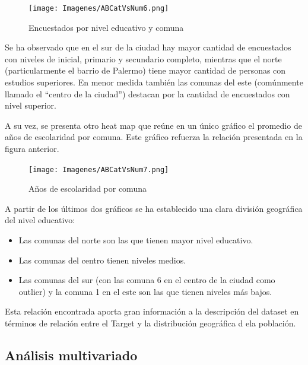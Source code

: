 \documentclass[a4paper]{article}
\begin{document}
            \begin{figure}[H]
            \centering
                \texttt{[image: Imagenes/ABCatVsNum6.png]}
                \caption{Encuestados por nivel educativo y comuna}
                \label{AB education level and location}
            \end{figure}
 
            Se ha observado que en el sur de la ciudad hay  mayor cantidad de encuestados con niveles de inicial, primario y secundario completo, mientras que el norte (particularmente el barrio de Palermo) tiene mayor cantidad de personas con estudios superiores. En menor medida también las comunas del este (comúnmente llamado el ``centro de la ciudad'') destacan por la cantidad de encuestados con nivel superior.

\vspace{1cm}

            A su vez, se presenta otro heat map que reúne en un único gráfico el promedio de años de escolaridad por comuna. Este gráfico refuerza la relación presentada en la figura anterior.

            \begin{figure}[H]
            \centering
                \texttt{[image: Imagenes/ABCatVsNum7.png]}
                \caption{Años de escolaridad por comuna}
                \label{AB years of education and location}
            \end{figure}
 
            A partir de los últimos dos gráficos se ha establecido una clara división geográfica del nivel educativo:
            \begin{itemize}
                \item Las comunas del norte son las que tienen mayor nivel educativo.
                \item Las comunas del centro tienen niveles medios.
                \item Las comunas del sur (con las comuna 6 en el centro de la ciudad como outlier) y la comuna 1 en el este son las que tienen niveles más bajos.
            \end{itemize}

            Esta relación encontrada aporta gran información a la descripción del dataset en términos de relación entre el Target y la distribución geográfica d ela población.
    
    \newpage
    
    \subsection{Análisis multivariado}
 
\end{document}
